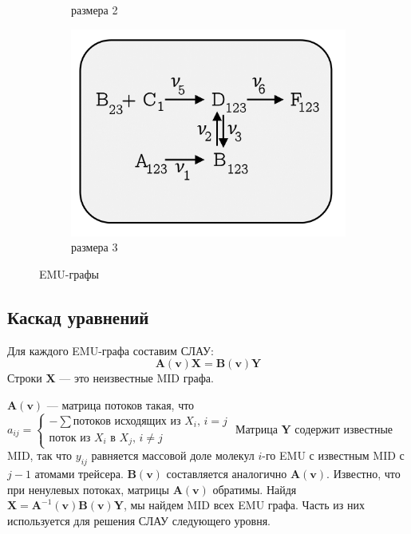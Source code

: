 \documentclass[14pt, a4paper]{extreport}
\begin{document}
\begin{figure}[b]
\begin{subfigure}{.3\linewidth}
		\caption{размера 2}
		\label {emu_graph_2}
	\end{subfigure}
	\begin{subfigure}{.3\linewidth}
		\includegraphics[width=1.2\linewidth]{EMU_graph_3.png}
		\caption{размера 3}
		\label {emu_graph_3}
	\end{subfigure}
	\caption{EMU-графы}
	\label{emu_graph}
\end{figure}

\clearpage

\subsection{Каскад уравнений}
Для каждого EMU-графа составим СЛАУ:
$$\mathbf{A}(\mathbf{v})\mathbf{X} = \mathbf{B}(\mathbf{v})\mathbf{Y}$$
Строки $\mathbf{X}$ --- это неизвестные MID графа.

\noindent $\mathbf{A}(\mathbf{v})$ --- матрица потоков такая, что 
$a_{ij} = 
\begin{cases} 
	\text{$-\sum$потоков исходящих из $X_i$, $i=j$}\\
	\text{поток из $X_i$ в $X_j$, $i\neq{}j$}
	\end{cases}
	$
Матрица $\mathbf{Y}$ содержит известные MID, так что $y_{ij}$ равняется массовой доле молекул $i$-го EMU с известным MID с $j - 1$ атомами трейсера. $\mathbf{B}(\mathbf{v})$ составляется аналогично $\mathbf{A}(\mathbf{v})$.
Известно, что при ненулевых потоках, матрицы $\mathbf{A}(\mathbf{v})$ обратимы\cite{anderson_1983}. Найдя $\mathbf{X} = \mathbf{A}^{-1}(\mathbf{v})\mathbf{B}(\mathbf{v})\mathbf{Y}$, мы найдем MID всех EMU графа. Часть из них используется для решения СЛАУ следующего уровня.
\end{document}
